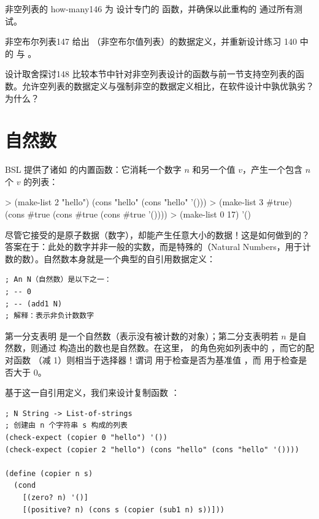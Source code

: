\begin{exercise}{非空列表的 how-many}{146}
为  设计专门的  函数，并确保以此重构的  通过所有测试。
\end{exercise}

\begin{exercise}{非空布尔列表}{147}
给出 （非空布尔值列表）的数据定义，并重新设计练习 140 中的  与 。
\end{exercise}

\begin{exercise}{设计取舍探讨}{148}
比较本节中针对非空列表设计的函数与前一节支持空列表的函数。允许空列表的数据定义与强制非空的数据定义相比，在软件设计中孰优孰劣？为什么？
\end{exercise}

\section{自然数}
\label{sec:ch09_natural_numbers}

BSL 提供了诸如  的内置函数：它消耗一个数字 $n$ 和另一个值 $v$，产生一个包含 $n$ 个 $v$ 的列表：
\begin{replbox}
> (make-list 2 "hello")
(cons "hello" (cons "hello" '()))
> (make-list 3 #true)
(cons #true (cons #true (cons #true '())))
> (make-list 0 17)
'()
\end{replbox}

尽管它接受的是原子数据（数字），却能产生任意大小的数据！这是如何做到的？
答案在于：此处的数字并非一般的实数，而是特殊的（Natural Numbers，用于计数的数）。自然数本身就是一个典型的自引用数据定义：
\begin{lstlisting}[language=BSL]
; An N（自然数）是以下之一：
; -- 0
; -- (add1 N)
; 解释：表示非负计数数字
\end{lstlisting}

第一分支表明  是一个自然数（表示没有被计数的对象）；第二分支表明若 $n$ 是自然数，则通过  构造出的数也是自然数。在这里， 的角色宛如列表中的 ，而它的配对函数 （减 1）则相当于选择器！谓词  用于检查是否为基准值 ，而  用于检查是否大于 0。

基于这一自引用定义，我们来设计复制函数 ：
\begin{lstlisting}[language=BSL]
; N String -> List-of-strings
; 创建由 n 个字符串 s 构成的列表
(check-expect (copier 0 "hello") '())
(check-expect (copier 2 "hello") (cons "hello" (cons "hello" '())))

(define (copier n s)
  (cond
    [(zero? n) '()]
    [(positive? n) (cons s (copier (sub1 n) s))]))
\end{lstlisting}

